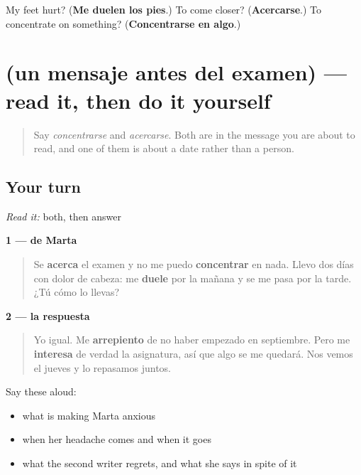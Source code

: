 \begin{tcolorbox}[breakable,colback=teal!4,colframe=teal!35!black,title={Before you move on}]
My feet hurt? (\textbf{Me duelen los pies}.) To come closer? (\textbf{Acercarse}.) To concentrate on something? (\textbf{Concentrarse en algo}.)
\end{tcolorbox}
\section[Practice]{(un mensaje antes del examen) — read it, then do it yourself}

\label{lesson:ES-C443-sintesis-animo}



\begin{quote}
Say \emph{concentrarse} and \emph{acercarse}. Both are in the message you are about to read, and one of them is about a date rather than a person.
\end{quote}

\subsection*{Your turn}
\emph{Read it:} both, then answer

\textbf{1 — de Marta}

\begin{quote}
Se \textbf{acerca} el examen y no me puedo \textbf{concentrar} en nada. Llevo dos días con dolor de cabeza: me \textbf{duele} por la mañana y se me pasa por la tarde. ¿Tú cómo lo llevas?
\end{quote}

\textbf{2 — la respuesta}

\begin{quote}
Yo igual. Me \textbf{arrepiento} de no haber empezado en septiembre. Pero me \textbf{interesa} de verdad la asignatura, así que algo se me quedará. Nos vemos el jueves y lo repasamos juntos.
\end{quote}

Say these aloud:

\begin{itemize}
\raggedright
  \item what is making Marta anxious
  \item when her headache comes and when it goes
  \item what the second writer regrets, and what she says in spite of it
\end{itemize}

